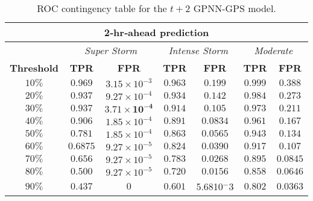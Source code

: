 \begin{table}[ht]
	\centering
	\caption{ROC contingency table for the $t+2$ GPNN-GPS model.}
	\label{table:rocgpnn2h}
	\begin{tabular}
		{c| c c | c c | c c}
		\hline
		\multicolumn{7}{c}{\textbf{2‐hr‐ahead prediction}} \\ 
		\hline
		 & \multicolumn{2}{c}{\textit{Super Storm}} & \multicolumn{2}{c}{\textit{Intense Storm}} & \multicolumn{2}{c}{\textit{Moderate}} \\ 
		\hline
		\textbf{Threshold} & \textbf{TPR} & \textbf{FPR} & \textbf{TPR} & \textbf{FPR} & \textbf{TPR} & \textbf{FPR} \\ 
		\hline
		$10\%$ & $0.969$ & $3.15\times10^{-3}$ & $0.963$ & $0.199$ & $0.999$ & $0.388$ \\ 
		$20\%$ & $0.937$ & $9.27\times10^{-4}$ & $0.934$ & $0.142$ & $0.984$ & $0.273$ \\ 
		$30\%$ & $\mathbf{0.937}$ & $\mathbf{3.71\times10^{-4}}$ & $\mathbf{0.914}$ & $\mathbf{0.105}$ & $0.973$ & $0.211$ \\ 
		$40\%$ & $0.906$ & $1.85\times10^{-4}$ & $0.891$ & $0.0834$ & $0.961$ & $0.167$ \\ 
		$50\%$ & $0.781$ & $1.85\times10^{-4}$ & $0.863$ & $0.0565$ & $0.943$ & $0.134$ \\ 
		$60\%$ & $0.6875$ & $9.27\times10^{-5}$ & $0.824$ & $0.0390$ & $\mathbf{0.917}$ & $\mathbf{0.107}$ \\ 
		$70\%$ & $0.656$ & $9.27\times10^{-5}$ & $0.783$ & $0.0268$ & $0.895$ & $0.0845$ \\ 
		$80\%$ & $0.500$ & $9.27\times10^{-5}$ & $0.720$ & $0.0156$ & $0.858$ & $0.0646$ \\ 
		$90\%$ & $0.437$ & $0$ & $0.601$ & 5.6810$^-3$ & $0.802$ & $0.0363$\\
		\hline
	\end{tabular}
\end{table}

